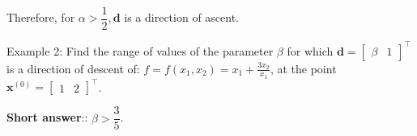 Therefore, for \(\alpha>\dfrac{1}{2}, \boldsymbol{d}\) is a direction of ascent.

\medskip
\noindent
Example 2: Find the range of values of the parameter \(\beta\) for which \(\boldsymbol{d}=\left[\begin{array}{ll}\beta & 1\end{array}\right]^{\top}\) is a direction of descent of: \(f=f\left(x_{1}, x_{2}\right)=x_{1}+\frac{3 x_{2}}{x_{1}}\), at the point \(\boldsymbol{x}^{(0)}=\left[\begin{array}{ll}1 & 2\end{array}\right]^{\top}\).

\textbf{Short answer}:: \(\beta>\dfrac{3}{5}\).
